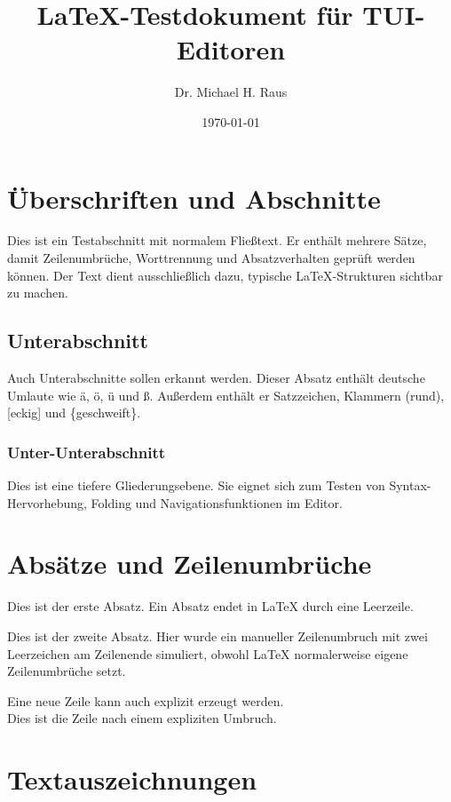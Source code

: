 \documentclass[a4paper,12pt]{article}
\title{LaTeX-Testdokument für TUI-Editoren}
\author{Dr. Michael H. Raus}
\date{\today}
\begin{document}
	\maketitle
	\tableofcontents

	\section{Überschriften und Abschnitte}

	Dies ist ein Testabschnitt mit normalem Fließtext. Er enthält mehrere Sätze,
	damit Zeilenumbrüche, Worttrennung und Absatzverhalten geprüft werden können.
	Der Text dient ausschließlich dazu, typische LaTeX-Strukturen sichtbar zu
	machen.

	\subsection{Unterabschnitt}

	Auch Unterabschnitte sollen erkannt werden. Dieser Absatz enthält deutsche
	Umlaute wie ä, ö, ü und ß. Außerdem enthält er Satzzeichen, Klammern
	(rund), [eckig] und \{geschweift\}.

	\subsubsection{Unter-Unterabschnitt}

	Dies ist eine tiefere Gliederungsebene. Sie eignet sich zum Testen von
	Syntax-Hervorhebung, Folding und Navigationsfunktionen im Editor.

	\section{Absätze und Zeilenumbrüche}

	Dies ist der erste Absatz. Ein Absatz endet in LaTeX durch eine Leerzeile.

	Dies ist der zweite Absatz.
	Hier wurde ein manueller Zeilenumbruch mit zwei Leerzeichen am Zeilenende
	simuliert, obwohl LaTeX normalerweise eigene Zeilenumbrüche setzt.

	Eine neue Zeile kann auch explizit erzeugt werden.\\
	Dies ist die Zeile nach einem expliziten Umbruch.

	\section{Textauszeichnungen}
\end{document}
